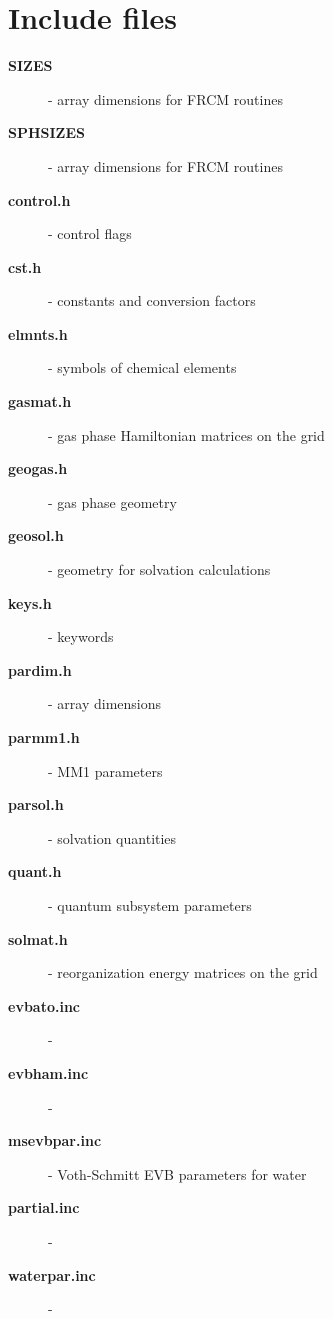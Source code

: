 \documentclass[oneside,11pt,openany]{book}
\newcommand{\tw}{\ttfamily}
\begin{document}
\section{Include files}
\begin{description}
\item[{\tw\bf SIZES}] - array dimensions for FRCM routines
\item[{\tw\bf SPHSIZES}] - array dimensions for FRCM routines
%
\item[{\tw\bf control.h}] - control flags
\item[{\tw\bf cst.h}] - constants and conversion factors
\item[{\tw\bf elmnts.h}] - symbols of chemical elements
\item[{\tw\bf gasmat.h}] - gas phase Hamiltonian matrices on the grid
\item[{\tw\bf geogas.h}] - gas phase geometry
\item[{\tw\bf geosol.h}] - geometry for solvation calculations
\item[{\tw\bf keys.h}] - keywords
\item[{\tw\bf pardim.h}] - array dimensions
\item[{\tw\bf parmm1.h}] - MM1 parameters
\item[{\tw\bf parsol.h}] - solvation quantities
\item[{\tw\bf quant.h}] - quantum subsystem parameters
\item[{\tw\bf solmat.h}] - reorganization energy matrices on the grid
%
\item[{\tw\bf evbato.inc}] -
\item[{\tw\bf evbham.inc}] -
\item[{\tw\bf msevbpar.inc}] - Voth-Schmitt EVB parameters for water
\item[{\tw\bf partial.inc}] -
\item[{\tw\bf waterpar.inc}] -
\end{description}
\end{document}
